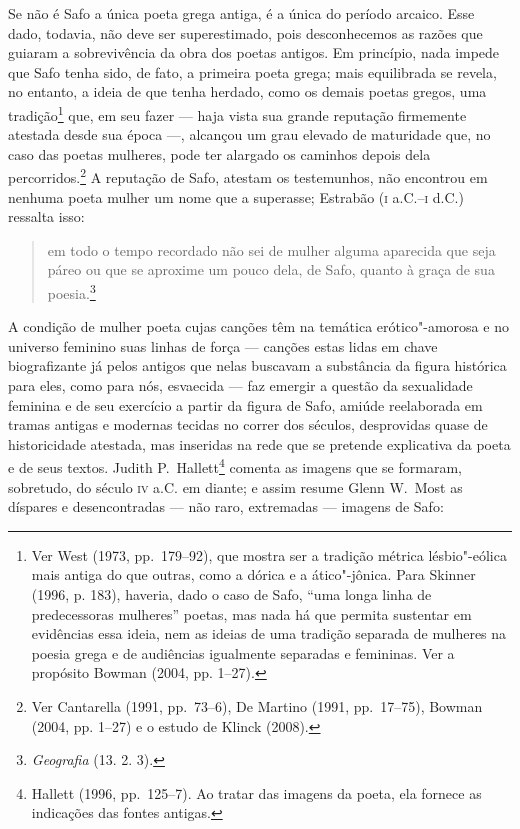 Se não é Safo a única poeta grega antiga, é a única do período
arcaico. Esse dado, todavia, não deve ser superestimado, pois desconhecemos as
razões que guiaram a sobrevivência da obra dos poetas antigos.
Em princípio, nada impede que Safo tenha sido, de fato, a primeira
poeta grega; mais equilibrada se revela, no entanto, a ideia de que tenha
herdado, como os demais poetas gregos, uma tradição\footnote{ Ver West (1973, pp.~179--92), que mostra ser a
tradição métrica lésbio"-eólica mais antiga do que outras, como a dórica e a
ático"-jônica. Para Skinner (1996, p. 183), haveria, dado o caso de Safo, “uma
longa linha de predecessoras mulheres” poetas, mas nada há que permita sustentar em evidências essa ideia, nem as ideias de uma tradição separada de mulheres na poesia grega e de audiências igualmente separadas e femininas. Ver a propósito Bowman (2004, pp. 1--27).} que, em seu fazer --- haja vista
sua grande reputação firmemente atestada desde sua época ---, alcançou um grau
elevado de maturidade que, no caso das poetas mulheres, pode ter alargado os
caminhos depois dela percorridos.\footnote{ Ver Cantarella (1991, pp.~73--6), De
Martino (1991, pp.~17--75), Bowman (2004, pp. 1--27) e o estudo de Klinck (2008).} A reputação de Safo, atestam os
testemunhos, não encontrou em nenhuma poeta mulher um nome que a
superasse; Estrabão (\textsc{i} a.C.--\textsc{i} d.C.) ressalta isso: 

\begin{quote}
em todo o tempo recordado não sei de mulher
alguma aparecida que seja páreo ou que se aproxime um pouco dela, de Safo,
quanto à graça de sua poesia.\footnote{ \textit{Geografia} (13. 2. 3).}
\end{quote}



A condição de mulher poeta cujas canções têm na temática erótico"-amorosa e no
universo feminino suas linhas de força --- canções estas lidas em chave
biografizante já pelos antigos que nelas buscavam a substância da figura
histórica para eles, como para nós, esvaecida --- faz emergir a questão da
sexualidade feminina e de seu exercício a partir da figura de Safo,
amiúde reelaborada em tramas antigas e modernas tecidas no correr dos
séculos, desprovidas quase de historicidade atestada, mas
inseridas na rede que se pretende explicativa da poeta e de seus textos. Judith
P.~Hallett\footnote{ Hallett (1996, pp.~125--7). Ao tratar das
imagens da poeta, ela fornece as indicações das fontes antigas.} comenta as
imagens que se formaram, sobretudo, do século \textsc{iv} a.C. em diante; e assim resume
Glenn W.~Most as díspares e desencontradas --- não raro,
extremadas --- imagens de Safo: 

